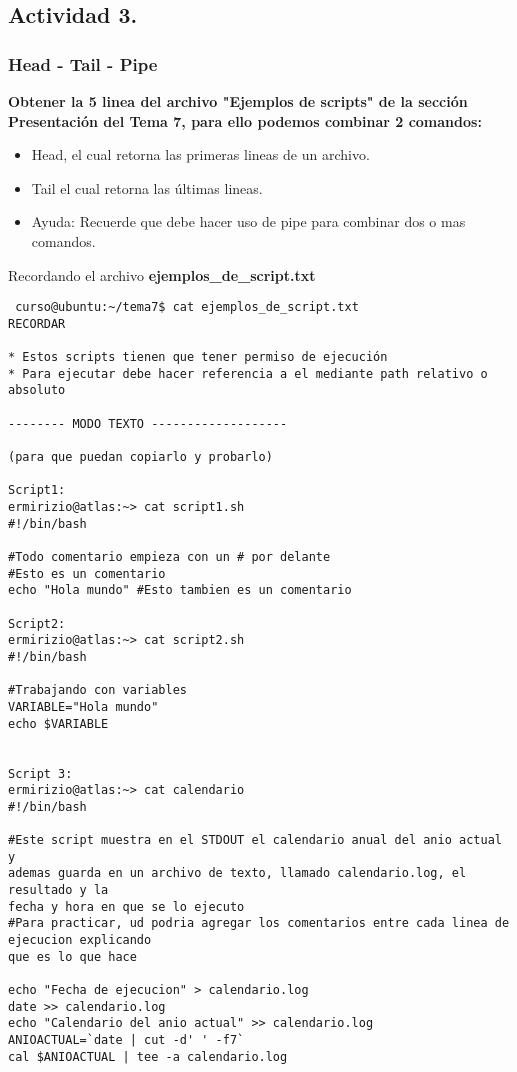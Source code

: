 \documentclass[a4paper,11pt,spanish]{article} %
\newenvironment{myscriptlisting}
{\begin{list}{}{\setlength{\leftmargin}{1em}}\item\scriptsize\bfseries}
{\end{list}}
\begin{document}
\subsection{Actividad 3.}

\subsubsection{Head - Tail - Pipe}

\textbf{Obtener la 5 linea del archivo  "Ejemplos de scripts" de la sección Presentación del Tema 7, 
para ello podemos combinar 2 comandos:}

\begin{itemize}
 \item Head, el cual retorna las primeras lineas de un archivo. 
 \item Tail el cual retorna las últimas lineas.
 \item Ayuda: Recuerde que debe hacer uso de pipe para combinar dos o mas comandos.
 \end{itemize}

Recordando el archivo \textbf{ejemplos\_de\_script.txt}
 
\begin{myscriptlisting}
 \begin{verbatim}
 curso@ubuntu:~/tema7$ cat ejemplos_de_script.txt 
RECORDAR

* Estos scripts tienen que tener permiso de ejecución
* Para ejecutar debe hacer referencia a el mediante path relativo o absoluto

-------- MODO TEXTO -------------------

(para que puedan copiarlo y probarlo) 

Script1:
ermirizio@atlas:~> cat script1.sh
#!/bin/bash

#Todo comentario empieza con un # por delante
#Esto es un comentario
echo "Hola mundo" #Esto tambien es un comentario

Script2:
ermirizio@atlas:~> cat script2.sh
#!/bin/bash

#Trabajando con variables
VARIABLE="Hola mundo"
echo $VARIABLE


Script 3:
ermirizio@atlas:~> cat calendario
#!/bin/bash

#Este script muestra en el STDOUT el calendario anual del anio actual y 
ademas guarda en un archivo de texto, llamado calendario.log, el resultado y la 
fecha y hora en que se lo ejecuto
#Para practicar, ud podria agregar los comentarios entre cada linea de ejecucion explicando 
que es lo que hace

echo "Fecha de ejecucion" > calendario.log
date >> calendario.log
echo "Calendario del anio actual" >> calendario.log
ANIOACTUAL=`date | cut -d' ' -f7`
cal $ANIOACTUAL | tee -a calendario.log
 \end{verbatim}
\end{myscriptlisting}
\end{document}
